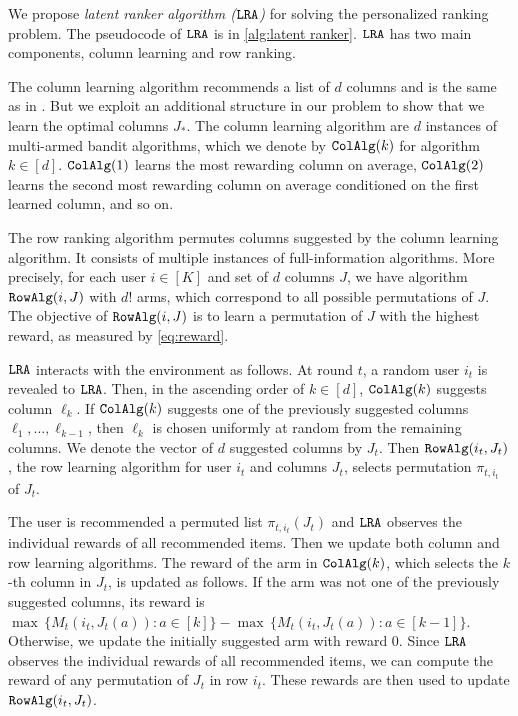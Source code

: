 

We propose \emph{latent ranker algorithm (${\tt LRA}$)} for solving the personalized ranking problem. The pseudocode of ${\tt LRA}$ is in \cref{alg:latent ranker}. ${\tt LRA}$ has two main components, column learning and row ranking.

The column learning algorithm recommends a list of $d$ columns and is the same as in \citet{radlinski2008learning}. But we exploit an additional structure in our problem to show that we learn the optimal columns $J_\ast$. The column learning algorithm are $d$ instances of multi-armed bandit algorithms, which we denote by ${\tt ColAlg}(k)$ for algorithm $k \in [d]$. ${\tt ColAlg}(1)$ learns the most rewarding column on average, ${\tt ColAlg}(2)$ learns the second most rewarding column on average conditioned on the first learned column, and so on.

The row ranking algorithm permutes columns suggested by the column learning algorithm. It consists of multiple instances of full-information algorithms. More precisely, for each user $i \in [K]$ and set of $d$ columns $J$, we have algorithm ${\tt RowAlg}(i, J)$ with $d!$ arms, which correspond to all possible permutations of $J$. The objective of ${\tt RowAlg}(i, J)$ is to learn a permutation of $J$ with the highest reward, as measured by \eqref{eq:reward}.

${\tt LRA}$ interacts with the environment as follows. At round $t$, a random user $i_t$ is revealed to ${\tt LRA}$. Then, in the ascending order of $k \in [d]$, ${\tt ColAlg}(k)$ suggests column $\ell_k$. If ${\tt ColAlg}(k)$ suggests one of the previously suggested columns $\ell_1, \dots, \ell_{k - 1}$, then $\ell_k$ is chosen uniformly at random from the remaining columns. We denote the vector of $d$ suggested columns  by $J_t$. Then ${\tt RowAlg}(i_t, J_t)$, the row learning algorithm for user $i_t$ and columns $J_t$, selects permutation $\pi_{t, i_t}$ of $J_t$.

The user is recommended a permuted list $\pi_{t, i_t}(J_t)$ and ${\tt LRA}$ observes the individual rewards of all recommended items. Then we update both column and row learning algorithms. The reward of the arm in ${\tt ColAlg}(k)$, which selects the $k$-th column in $J_t$, is updated as follows. If the arm was not one of the previously suggested columns, its reward is $\max \, \{M_t(i_t, J_t(a)): a \in [k]\} - \max \, \{M_t(i_t, J_t(a)): a \in [k - 1]\}$. Otherwise, we update the initially suggested arm with reward $0$. Since ${\tt LRA}$ observes the individual rewards of all recommended items, we can compute the reward of any permutation of $J_t$ in row $i_t$. These rewards are then used to update ${\tt RowAlg}(i_t, J_t)$. 

